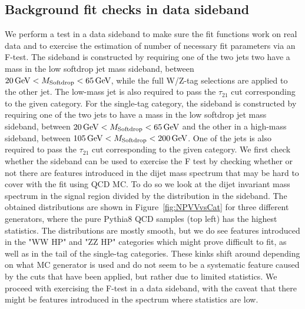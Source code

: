 \subsection{Background fit checks in data sideband}
\label{sec:app:2016bkgfit}
We perform a test in a data sideband to make sure the fit functions work on real data and to exercise the estimation of number of necessary fit parameters via an F-test.
The sideband is constructed by requiring one of the two jets two have a mass in the low softdrop jet mass sideband, between $20 \,\text{Ge\hspace{-.08em}V} < M_{\rm{Softdrop}} < 65 \,\text{Ge\hspace{-.08em}V}$, while the full W/Z-tag selections are applied to the other jet. The low-mass jet is also required to pass the $\tau_{21}$ cut corresponding to the given category. For the single-tag category, the sideband is constructed by requiring one of the two jets to have a mass in the low softdrop jet mass sideband, between $20 \,\text{Ge\hspace{-.08em}V} < M_{\rm{Softdrop}} < 65 \,\text{Ge\hspace{-.08em}V}$ and the other in a high-mass sideband, between $105 \,\text{Ge\hspace{-.08em}V} < M_{\rm{Softdrop}} < 200 \,\text{Ge\hspace{-.08em}V}$. One of the jets is also required to pass the $\tau_{21}$ cut corresponding to the given category.
We first check whether the sideband can be used to exercise the F test by checking whether or not there are features introduced in the dijet mass spectrum that may be hard to cover with the fit using QCD MC. To do so we look at the dijet invariant mass spectrum in the signal region divided by the distribution in the sideband. The obtained distributions are shown in Figure~\ref{fig:NPVVvsCat} for three different generators, where the pure Pythia8 QCD samples (top left) has the highest statistics. The  distributions are mostly smooth, but we do see features introduced in the "WW HP" and "ZZ HP" categories which might prove difficult to fit, as well as in the tail of the single-tag categories. These kinks shift around depending on what MC generator is used and do not seem to be a systematic feature caused by the cuts that have been applied, but rather due to limited statistics. We proceed with exercising the F-test in a data sideband, with the caveat that there might be features introduced in the spectrum where statistics are low.

